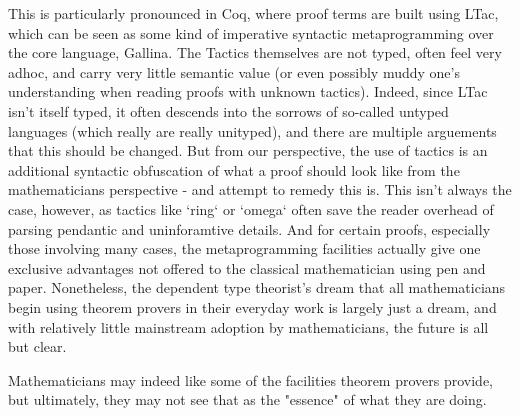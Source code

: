 This is particularly pronounced in Coq, where proof terms are built using LTac,
which can be seen as some kind of imperative syntactic metaprogramming over the
core language, Gallina. The Tactics themselves are not typed, often feel very
adhoc, and carry very little semantic value (or even possibly muddy one's
understanding when reading proofs with unknown tactics). Indeed, since LTac
isn't itself typed, it often descends into the sorrows of so-called untyped
languages (which really are really unityped), and there are multiple arguements
that this should be changed. But from our perspective, the use of tactics is an
additional syntactic obfuscation of what a proof should look like from the
mathematicians perspective - and attempt to remedy this is. This isn't always
the case, however, as tactics like `ring` or `omega` often save the reader
overhead of parsing pendantic and uninforamtive details. And for certain proofs,
especially those involving many cases, the metaprogramming facilities actually
give one exclusive advantages not offered to the classical mathematician using
pen and paper. Nonetheless, the dependent type theorist's dream that all
mathematicians begin using theorem provers in their everyday work is largely
just a dream, and with relatively little mainstream adoption by mathematicians,
the future is all but clear.

Mathematicians may indeed like some of the facilities theorem provers provide,
but ultimately, they may not see that as the "essence" of what they are doing.
